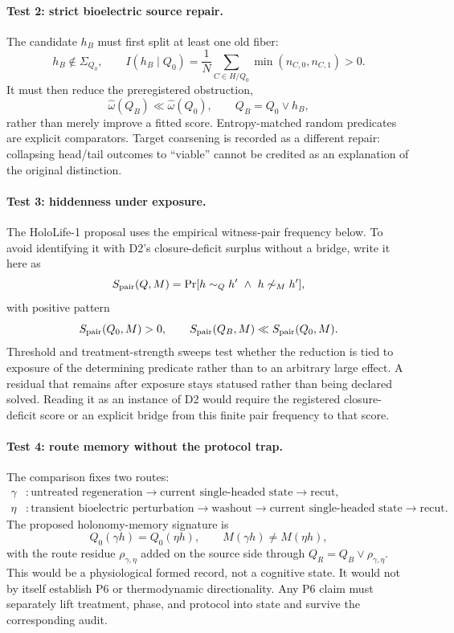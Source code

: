 \paragraph{Test 2: strict bioelectric source repair.}
The candidate $h_B$ must first split at least one old fiber:
\[
h_B\notin\Sigma_{Q_0},
\qquad
I(h_B\mid Q_0)
=\frac1N\sum_{C\in H/Q_0}\min(n_{C,0},n_{C,1})>0.
\]
It must then reduce the preregistered obstruction,
\[
\widehat\omega(Q_B)\ll\widehat\omega(Q_0),
\qquad Q_B=Q_0\vee h_B,
\]
rather than merely improve a fitted score.  Entropy-matched random
predicates are explicit comparators.  Target coarsening is recorded as a
different repair: collapsing head/tail outcomes to ``viable'' cannot be
credited as an explanation of the original distinction.

\paragraph{Test 3: hiddenness under exposure.}
The HoloLife-1 proposal uses the empirical witness-pair frequency
below.  To avoid identifying it with D2's closure-deficit surplus without a
bridge, write it here as
\[
S_{\rm pair}(Q,M)=\Pr[h\sim_Q h'\ \wedge\ h\not\sim_M h'],
\]
with positive pattern
\[
S_{\rm pair}(Q_0,M)>0,
\qquad
S_{\rm pair}(Q_B,M)\ll S_{\rm pair}(Q_0,M).
\]
Threshold and treatment-strength sweeps test whether the reduction is tied
to exposure of the determining predicate rather than to an arbitrary large
effect.  A residual that remains after exposure stays statused rather than
being declared solved.  Reading it as an instance of D2 would require the
registered closure-deficit score or an explicit bridge from this finite pair
frequency to that score.

\paragraph{Test 4: route memory without the protocol trap.}
The comparison fixes two routes:
\[
\begin{aligned}
\gamma &: \text{untreated regeneration}
\to\text{current single-headed state}\to\text{recut},\\
\eta &: \text{transient bioelectric perturbation}
\to\text{washout}\to\text{current single-headed state}\to\text{recut}.
\end{aligned}
\]
The proposed holonomy-memory signature is
\[
Q_0(\gamma h)=Q_0(\eta h),
\qquad
M(\gamma h)\ne M(\eta h),
\]
with the route residue $\rho_{\gamma,\eta}$ added on the source side through
$Q_R=Q_B\vee\rho_{\gamma,\eta}$.  This would be a physiological formed
record, not a cognitive state.  It would not by itself establish P6 or
thermodynamic directionality.  Any P6 claim must separately lift treatment,
phase, and protocol into state and survive the corresponding audit.

